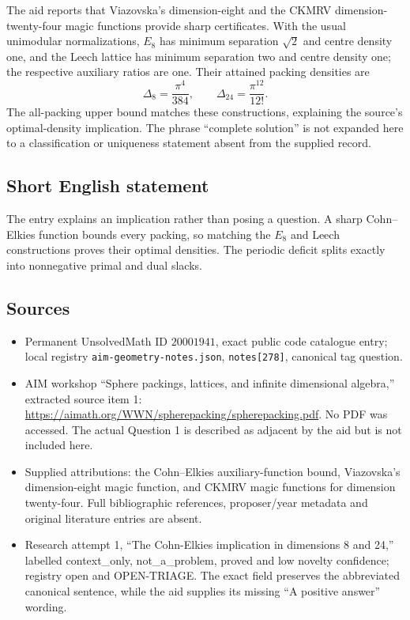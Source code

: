 \documentclass[11pt]{article}
\begin{document}
The aid reports that Viazovska's dimension-eight and the CKMRV dimension-twenty-four magic functions provide sharp certificates. With the usual unimodular normalizations, \(E_8\) has minimum separation \(\sqrt2\) and centre density one, and the Leech lattice has minimum separation two and centre density one; the respective auxiliary ratios are one. Their attained packing densities are
\[
 \Delta_8=\frac{\pi^4}{384},\qquad
 \Delta_{24}=\frac{\pi^{12}}{12!}.
\]
The all-packing upper bound matches these constructions, explaining the source's optimal-density implication. The phrase ``complete solution'' is not expanded here to a classification or uniqueness statement absent from the supplied record.
\subsection{Short English statement}
The entry explains an implication rather than posing a question. A sharp Cohn--Elkies function bounds every packing, so matching the \(E_8\) and Leech constructions proves their optimal densities. The periodic deficit splits exactly into nonnegative primal and dual slacks.
\subsection{Sources}
\begin{itemize}
\item Permanent UnsolvedMath ID \(20001941\), exact public code catalogue entry; local registry \texttt{aim-geometry-notes.json}, \texttt{notes[278]}, canonical tag question.
\item AIM workshop ``Sphere packings, lattices, and infinite dimensional algebra,'' extracted source item 1: \url{https://aimath.org/WWN/spherepacking/spherepacking.pdf}. No PDF was accessed. The actual Question 1 is described as adjacent by the aid but is not included here.
\item Supplied attributions: the Cohn--Elkies auxiliary-function bound, Viazovska's dimension-eight magic function, and CKMRV magic functions for dimension twenty-four. Full bibliographic references, proposer/year metadata and original literature entries are absent.
\item Research attempt 1, ``The Cohn-Elkies implication in dimensions 8 and 24,'' labelled context\_only, not\_a\_problem, proved and low novelty confidence; registry open and OPEN-TRIAGE. The exact field preserves the abbreviated canonical sentence, while the aid supplies its missing ``A positive answer'' wording.
\end{itemize}
\end{document}
